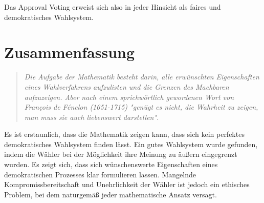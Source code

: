 \documentclass[BCOR5mm,DIV12,a4paper,10pt]{scrartcl}
\begin{document}
Das Approval Voting erweist sich also in jeder Hinsicht als faires und demokratisches Wahlsystem.

\section{Zusammenfassung}
\begin{quote}\textit{
Die Aufgabe der Mathematik besteht darin, alle erwünschten Eigenschaften eines Wahlverfahrens aufzulisten und die Grenzen des Machbaren aufzuzeigen. Aber nach einem sprichwörtlich gewordenen Wort von François de Fénelon (1651-1715) "genügt es nicht, die Wahrheit zu zeigen, man muss sie auch liebenswert darstellen". \cite{spektrum}
}
\end{quote}

Es ist erstaunlich, dass die Mathematik zeigen kann, dass sich kein perfektes demokratisches Wahlsystem finden lässt. Ein gutes Wahlsystem wurde gefunden, indem die Wähler bei der Möglichkeit ihre Meinung zu äußern eingegrenzt wurden. Es zeigt sich, dass sich wünschenswerte Eigenschaften eines demokratischen Prozesses klar formulieren lassen. Mangelnde Kompromissbereitschaft und Unehrlichkeit der Wähler ist jedoch ein ethisches Problem, bei dem naturgemäß jeder mathematische Ansatz versagt.

\newpage

\end{document}
